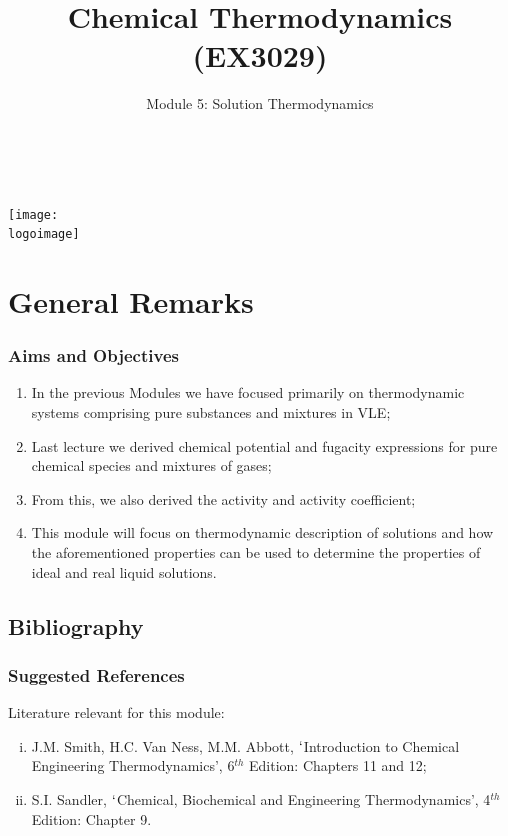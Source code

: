 \documentclass[10pt,compress,handout,ignorenonframetext]{beamer}
\institute{School of Engineering}
\title{Chemical Thermodynamics (EX3029)}
\subtitle{Module 5: Solution Thermodynamics}
\date[ ]{ }
\author[\shortname]{%
  \fullname\\\ttfamily{\emailaddress}
}
\newcommand{\logoimage}{../../FigBanner/UoAHorizBanner}
\begin{document}
\begin{frame}
  \titlepage
  \vfill%
  \begin{center}
    \texttt{[image: \\logoimage]}
  \end{center}
\end{frame}




\section{General Remarks}

\begin{frame}
 \frametitle{Aims and Objectives}
   \begin{enumerate}
     \item<1-> In the previous Modules we have focused primarily on thermodynamic systems comprising pure substances and mixtures in VLE;
     \item<1-> Last lecture we derived chemical potential and fugacity expressions for pure chemical species and mixtures of gases;
     \item<1-> From this, we also derived the activity and activity coefficient;
     \item<1-> This module will focus on thermodynamic description of solutions and how the aforementioned properties can be used to determine the properties of ideal and real liquid solutions. 
   \end{enumerate}
\end{frame}


\subsection{Bibliography}
\begin{frame}
 \frametitle{Suggested References}
  Literature relevant for this module:
  \begin{enumerate}[(i)]
   \item\label{SVN_Book} J.M. Smith, H.C. Van Ness, M.M. Abbott, $\lq$Introduction to Chemical Engineering Thermodynamics', 6$^{th}$ Edition: Chapters 11 and 12;
   \item\label{Sandle_Book} S.I. Sandler, $\lq$Chemical, Biochemical and Engineering Thermodynamics', 4$^{th}$ Edition: Chapter 9.
  \end{enumerate}
\end{frame}
\end{document}
